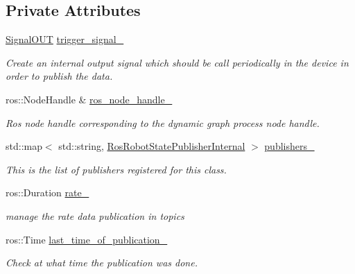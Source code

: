 \subsection*{Private Attributes}
\begin{DoxyCompactItemize}
\item 
\hyperlink{namespacedynamic__graph_a9d80c350c95e161319d7a6e629ecdc4b}{Signal\+O\+UT} \hyperlink{classdynamic__graph_1_1RosRobotStatePublisher_a175914c0624474d019cb1360fa9c14e4}{trigger\+\_\+signal\+\_\+}
\begin{DoxyCompactList}\small\item\em Create an internal output signal which should be call periodically in the device in order to publish the data. \end{DoxyCompactList}\item 
ros\+::\+Node\+Handle \& \hyperlink{classdynamic__graph_1_1RosRobotStatePublisher_a5b494e473d93118cb69320c01dfd772c}{ros\+\_\+node\+\_\+handle\+\_\+}\hypertarget{classdynamic__graph_1_1RosRobotStatePublisher_a5b494e473d93118cb69320c01dfd772c}{}\label{classdynamic__graph_1_1RosRobotStatePublisher_a5b494e473d93118cb69320c01dfd772c}

\begin{DoxyCompactList}\small\item\em Ros node handle corresponding to the dynamic graph process node handle. \end{DoxyCompactList}\item 
std\+::map$<$ std\+::string, \hyperlink{structdynamic__graph_1_1RosRobotStatePublisherInternal}{Ros\+Robot\+State\+Publisher\+Internal} $>$ \hyperlink{classdynamic__graph_1_1RosRobotStatePublisher_a556fe3ed8d7c0786e0d6aad4cbb415db}{publishers\+\_\+}
\begin{DoxyCompactList}\small\item\em This is the list of publishers registered for this class. \end{DoxyCompactList}\item 
ros\+::\+Duration \hyperlink{classdynamic__graph_1_1RosRobotStatePublisher_af638eb336998964161a89e4ce76821d1}{rate\+\_\+}\hypertarget{classdynamic__graph_1_1RosRobotStatePublisher_af638eb336998964161a89e4ce76821d1}{}\label{classdynamic__graph_1_1RosRobotStatePublisher_af638eb336998964161a89e4ce76821d1}

\begin{DoxyCompactList}\small\item\em manage the rate data publication in topics \end{DoxyCompactList}\item 
ros\+::\+Time \hyperlink{classdynamic__graph_1_1RosRobotStatePublisher_a000e917f448ac480bfc8b2559d41a4b5}{last\+\_\+time\+\_\+of\+\_\+publication\+\_\+}\hypertarget{classdynamic__graph_1_1RosRobotStatePublisher_a000e917f448ac480bfc8b2559d41a4b5}{}\label{classdynamic__graph_1_1RosRobotStatePublisher_a000e917f448ac480bfc8b2559d41a4b5}

\begin{DoxyCompactList}\small\item\em Check at what time the publication was done. \end{DoxyCompactList}\end{DoxyCompactItemize}

